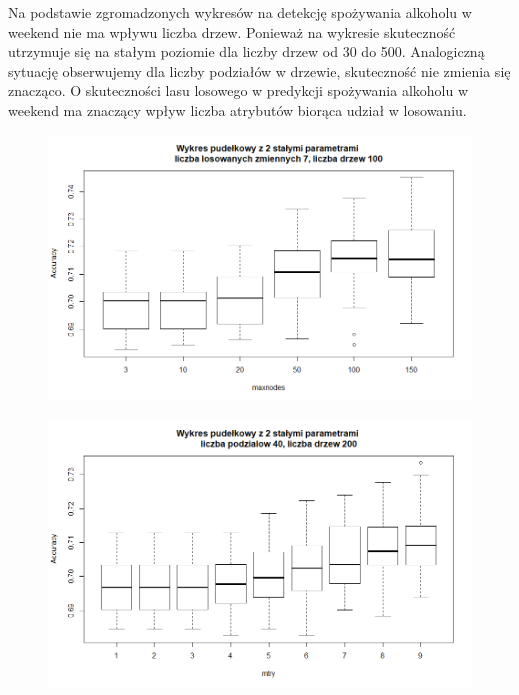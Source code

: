 Na podstawie zgromadzonych wykresów na detekcję spożywania alkoholu w weekend nie ma wpływu liczba drzew. Ponieważ na wykresie skuteczność utrzymuje się na stałym poziomie dla liczby drzew od 30 do 500. Analogiczną sytuację obserwujemy dla liczby podziałów w drzewie, skuteczność nie zmienia się znacząco.
O skuteczności lasu losowego w predykcji spożywania alkoholu w weekend ma znaczący wpływ liczba atrybutów biorąca udział w losowaniu. 


\begin{figure}[h]
     \centering 
     \includegraphics[scale=0.60]{tex/boxplot_dalc_maxnodes_v2.png}
     \label{fig:classes}
\end{figure}

\begin{figure}[h]
     \centering 
     \includegraphics[scale=0.60]{tex/boxplot_dalc_mtry_v2.png}
     \label{fig:classes}
\end{figure}

